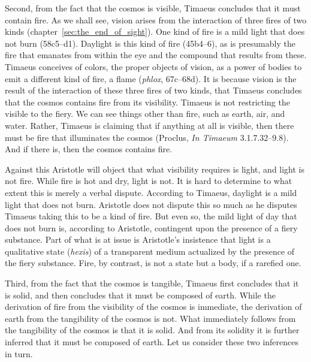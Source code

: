 Second, from the fact that the cosmos is visible, Timaeus concludes that it must contain fire. As we shall see, vision arises from the interaction of three fires of two kinds (chapter~\ref{sec:the_end_of_sight}). One kind of fire is a mild light that does not burn (58c5–d1). Daylight is this kind of fire (45b4–6), as is presumably the fire that emanates from within the eye and the compound that results from these. Timaeus conceives of colors, the proper objects of vision, as a power of bodies to emit a different kind of fire, a flame (\emph{phlox}, 67c–68d). It is because vision is the result of the interaction of these three fires of two kinds, that Timaeus concludes that the cosmos contains fire from its visibility. Timaeus is not restricting the visible to the fiery. We can see things other than fire, such as earth, air, and water. Rather, Timaeus is claiming that if anything at all is visible, then there must be fire that illuminates the cosmos (Proclus, \emph{In Timaeum} 3.1.7.32--9.8). And if there is, then the cosmos contains fire.

Against this Aristotle will object that what visibility requires is light, and light is not fire. While fire is hot and dry, light is not. It is hard to determine to what extent this is merely a verbal dispute. According to Timaeus, daylight is a mild light that does not burn. Aristotle does not dispute this so much as he disputes Timaeus taking this to be a kind of fire. But even so, the mild light of day that does not burn is, according to Aristotle, contingent upon the presence of a fiery substance. Part of what is at issue is Aristotle's insistence that light is a qualitative state (\emph{hexis}) of a transparent medium actualized by the presence of the fiery substance. Fire, by contrast, is not a state but a body, if a rarefied one.

Third, from the fact that the cosmos is tangible, Timaeus first concludes that it is solid, and then concludes that it must be composed of earth. While the derivation of fire from the visibility of the cosmos is immediate, the derivation of earth from the tangibility of the cosmos is not. What immediately follows from the tangibility of the cosmos is that it is solid. And from its solidity it is further inferred that it must be composed of earth. Let us consider these two inferences in turn. 

